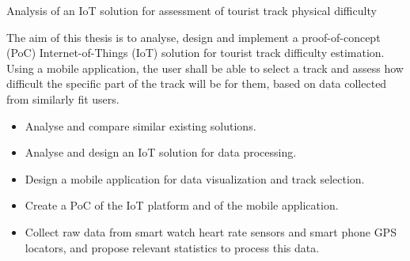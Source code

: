 \linebreak
Analysis of an IoT solution for assessment of tourist track physical difficulty

The aim of this thesis is to analyse, design and implement a proof-of-concept  (PoC) Internet-of-Things (IoT) solution for tourist track difficulty estimation.
Using a mobile application, the user shall be able to select a track and assess how difficult the specific part of the track will be for them, based on data collected from similarly fit users.
\begin{itemize}
    \item Analyse and compare similar existing solutions.
    \item Analyse and design an IoT solution for data processing.
    \item Design a mobile application for data visualization and track selection.
    \item Create a PoC of the IoT platform and of the mobile application.
    \item Collect raw data from smart watch heart rate sensors and smart phone GPS locators, and propose relevant statistics to process this data. 
\end{itemize}
